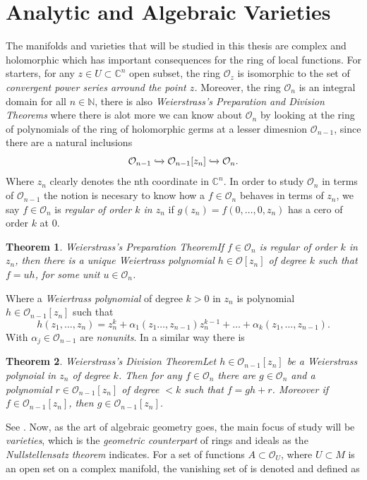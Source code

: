 \documentclass[12pt,twoside,a4paper]{report}
\newtheorem{theorem}{Theorem}[section]
\newcommand{\nat}{\ensuremath{ \mathbb N }}
\newcommand{\con}{\ensuremath{\mathbb{C}^n}}
\newcommand{\osheaf}{\ensuremath{\mathcal O }}
\begin{document}
\section{Analytic and Algebraic Varieties}
\noindent The manifolds and varieties that will be studied in this thesis are complex and holomorphic which has important consequences for the ring of local functions. For starters, for any $z\in U\subset\con$ open subset, the ring $\osheaf_{z}$ is isomorphic to the set of \emph{convergent power series arround the point $z$.} Moreover, the ring $\osheaf_{n}$ is an integral domain for all $n\in\nat$, there is also \emph{Weierstrass's Preparation and Division Theorems} where there is alot more we can know about $\osheaf_{n}$ by looking at the ring of polynomials of the ring of holomorphic germs at a lesser dimesnion $\osheaf_{n-1}$, since there are a natural inclusions
\[
  \osheaf_{n-1}\xhookrightarrow{}\osheaf_{n-1}[z_{n}]\xhookrightarrow{}\osheaf_{n}.
\]
Where $z_{n}$ clearly denotes the nth coordinate in $\con$. In order to study $\osheaf_{n}$ in terms of $\osheaf_{n-1}$ the notion is necesary to know how a $f\in\osheaf_{n}$ behaves in terms of $z_{n}$, we say $f\in\osheaf_{n}$ is \emph{regular of order $k$ in $z_{n}$} if $g(z_{n})=f(0,\dots,0,z_{n})$ has a cero of order $k$ at $0$.
\begin{theorem}{Weierstrass's Preparation Theorem}\label{weier-prep}
If $f\in\osheaf_{n}$ is regular of order $k$ in $z_{n}$, then there is a unique \emph{Weiertrass polynomial} $h\in\osheaf[z_{n}]$ of degree $k$ such that $f=uh$, for some unit $u\in\osheaf_{n}$.
\end{theorem}
Where a \emph{Weiertrass polynomial} of degree $k>0$ in $z_{n}$ is polynomial $h\in\osheaf_{n-1}[z_{n}]$ such that
\[
  h(z_{1},\dots,z_{n})=z_{n}^{k}+\alpha_{1}(z_{1}\dots,z_{n-1})z_{n}^{k-1}+\dots+\alpha_{k}(z_{1},\dots,z_{n-1}).
\]
With $\alpha_{j}\in\osheaf_{n-1}$ are \emph{nonunits}. In a similar way there is
\begin{theorem}{Weierstrass's Division Theorem}\label{weier-div}
  Let $h\in\osheaf_{n-1}[z_{n}]$ be a \emph{Weierstrass polynoial in $z_{n}$} of degree $k$. Then for any $f\in\osheaf_{n}$ there are $g\in\osheaf_{n}$ and a polynomial $r\in\osheaf_{n-1}[z_{n}]$ of degree $<k$ such that $f=gh+r$. Moreover if $f\in\osheaf_{n-1}[z_{n}]$, then $g\in\osheaf_{n-1}[z_{n}]$.
\end{theorem}
See \cite{Gunnin-Rossi}. Now, as the art of algebraic geometry goes, the main focus of study will be \emph{varieties}, which is the \emph{geometric counterpart} of rings and ideals as the \emph{Nullstellensatz theorem} indicates. For a set of functions $A\subset\osheaf_{U}$, where $U\subset M$ is an open set on a complex manifold, the vanishing set of is denoted and defined as
\end{document}
